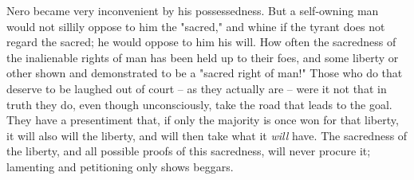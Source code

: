 \documentclass[a4paper]{book}
\begin{document}
Nero became very inconvenient by his possessedness. But a self-owning man 
would not sillily oppose to him the "{}sacred,"{} and whine if the tyrant does 
not regard the sacred; he would oppose to him his will. How often the 
sacredness of the inalienable rights of man has been held up to their foes, 
and some liberty or other shown and demonstrated to be a "{}sacred right of 
man!"{} Those who do that deserve to be laughed out of court -- as they 
actually are -- were it not that in truth they do, even though unconsciously, 
take the road that leads to the goal. They have a presentiment that, if only 
the majority is once won for that liberty, it will also will the liberty, and 
will then take what it \textit{will} have. The sacredness of the liberty, and 
all possible proofs of this sacredness, will never procure it; lamenting and 
petitioning only shows beggars.
\end{document}
